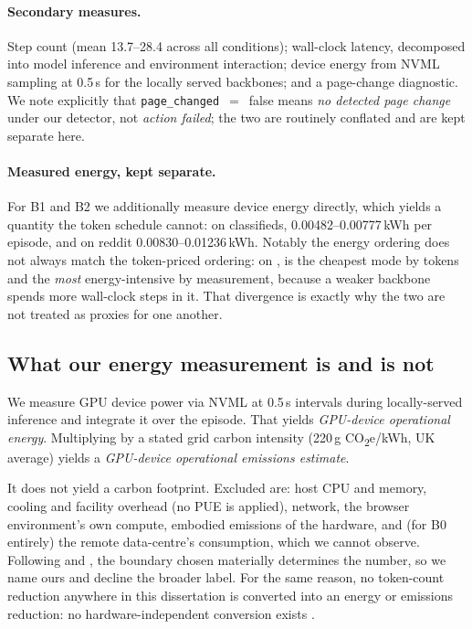 \paragraph{Secondary measures.} Step count (mean 13.7--28.4 across all
conditions); wall-clock latency, decomposed into model inference and environment
interaction; device energy from NVML sampling at 0.5\,s for the locally served
backbones; and a page-change diagnostic. We note explicitly that
\texttt{page\_changed}~$=$~false means \emph{no detected page change} under our
detector, not \emph{action failed}; the two are routinely conflated and are kept
separate here.

\paragraph{Measured energy, kept separate.} For B1 and B2 we additionally
measure device energy directly, which yields a quantity the token schedule
cannot: on classifieds, 0.00482--0.00777\,kWh per episode, and on reddit
0.00830--0.01236\,kWh. Notably the energy ordering does not always match the token-priced ordering: on , \mVis{} is the cheapest mode by
tokens and the \emph{most} energy-intensive by measurement, because a weaker
backbone spends more wall-clock steps in it. That divergence is exactly why the
two are not treated as proxies for one another.

\subsection{What our energy measurement is and is not}
\label{sec:sustainability}

We measure GPU device power via NVML at 0.5\,s intervals during locally-served
inference and integrate it over the episode. That yields \emph{GPU-device
operational energy}. Multiplying by a stated grid carbon intensity (220\,g
CO\textsubscript{2}e/kWh, UK average) yields a \emph{GPU-device operational
emissions estimate}.

It does not yield a carbon footprint. Excluded are: host CPU and memory, cooling
and facility overhead (no PUE is applied), network, the browser environment's own
compute, embodied emissions of the hardware, and (for B0 entirely) the remote data-centre's consumption, which we cannot observe. Following
\citet{gupta2022chasing} and \citet{luccioni2022bloom}, the boundary chosen
materially determines the number, so we name ours and decline the broader label.
For the same reason, no token-count reduction anywhere in this dissertation is
converted into an energy or emissions reduction: no hardware-independent
conversion exists \citep{fernandez2025energy}.

